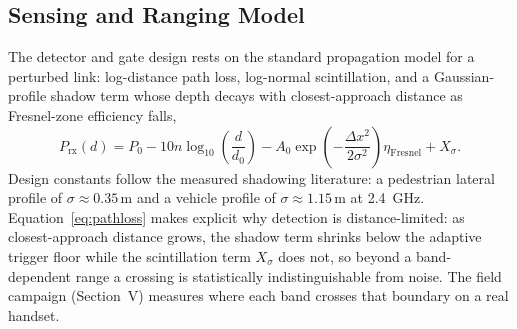 \documentclass[journal,10pt]{IEEEtran}
\begin{document}
\subsection{Sensing and Ranging Model}
\label{sec:model}
The detector and gate design rests on the standard propagation model for a
perturbed link: log-distance path loss, log-normal scintillation, and a
Gaussian-profile shadow term whose depth decays with closest-approach
distance as Fresnel-zone efficiency falls,
{\small
\begin{equation}
P_{\mathrm{rx}}(d) = P_0 - 10n \log_{10}\left(\frac{d}{d_0}\right) - A_0 \exp\left(-\frac{\Delta x^2}{2\sigma^2}\right) \eta_{\mathrm{Fresnel}} + X_\sigma .
\label{eq:pathloss}
\end{equation}}
Design constants follow the measured shadowing literature: a pedestrian
lateral profile of $\sigma \approx 0.35$\,m and a vehicle profile of
$\sigma \approx 1.15$\,m at 2.4~GHz. Equation~\eqref{eq:pathloss} makes
explicit why detection is distance-limited: as closest-approach distance
grows, the shadow term shrinks below the adaptive trigger floor while the
scintillation term $X_\sigma$ does not, so beyond a band-dependent range a
crossing is statistically indistinguishable from noise. The field campaign
(Section~V) measures where each band crosses that boundary on a real
handset.
\end{document}

